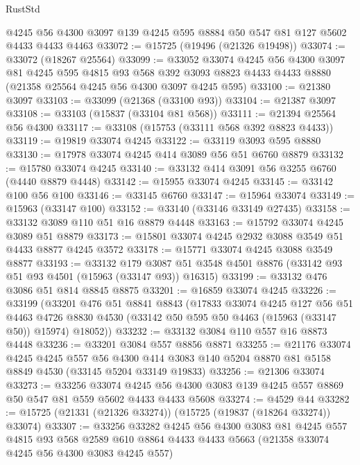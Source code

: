 \begin{lexlean}{RustStd}
\begin{coremodule}
    @4245
    @56
    @4300
    @3097
    @139
    @4245
    @595
    @8884
    @50
    @547
    @81
    @127
    @5602
    @4433
    @4433
    @4463
@33072 := @15725 (@19496 (@21326 @19498))
@33074 := @33072 (@18267 @25564)
@33099 := @33052
    @33074
    @4245
    @56
    @4300
    @3097
    @81
    @4245
    @595
    @4815
    @93
    @568
    @392
    @3093
    @8823
    @4433
    @4433
    @8880
    (@21358 @25564 @4245 @56 @4300 @3097 @4245 @595)
@33100 := @21380 @3097
@33103 := @33099 (@21368 (@33100 @93))
@33104 := @21387 @3097
@33108 := @33103 (@15837 (@33104 @81 @568))
@33111 := @21394 @25564 @56 @4300
@33117 := @33108 (@15753 (@33111 @568 @392 @8823 @4433))
@33119 := @19819 @33074 @4245
@33122 := @33119 @3093 @595 @8880
@33130 := @17978 @33074 @4245 @414 @3089 @56 @51 @6760 @8879
@33132 := @15780 @33074 @4245
@33140 := @33132 @414 @3091 @56 @3255 @6760 (@4440 @8879 @4448)
@33142 := @15955 @33074 @4245
@33145 := @33142 @100 @56 @100
@33146 := @33145 @6760
@33147 := @15964 @33074
@33149 := @15963 (@33147 @100)
@33152 := @33140 (@33146 @33149 @27435)
@33158 := @33132 @3089 @110 @51 @16 @8879 @4448
@33163 := @15792 @33074 @4245 @3089 @51 @8879
@33173 := @15801 @33074 @4245 @2932 @3088 @3549 @51 @4433 @8877 @4245 @3572
@33178 := @15771 @33074 @4245 @3088 @3549 @8877
@33193 := @33132
    @179
    @3087
    @51
    @3548
    @4501
    @8876
    (@33142 @93 @51 @93 @4501 (@15963 (@33147 @93)) @16315)
@33199 := @33132 @476 @3086 @51 @814 @8845 @8875
@33201 := @16859 @33074 @4245
@33226 := @33199
    (@33201
      @476
      @51
      @8841
      @8843
      (@17833
        @33074
        @4245
        @127
        @56
        @51
        @4463
        @4726
        @8830
        @4530
        (@33142 @50 @595 @50 @4463 (@15963 (@33147 @50)) @15974)
        @18052))
@33232 := @33132 @3084 @110 @557 @16 @8873 @4448
@33236 := @33201 @3084 @557 @8856 @8871
@33255 := @21176
    @33074
    @4245
    @4245
    @557
    @56
    @4300
    @414
    @3083
    @140
    @5204
    @8870
    @81
    @5158
    @8849
    @4530
    (@33145 @5204 @33149 @19833)
@33256 := @21306 @33074
@33273 := @33256
    @33074
    @4245
    @56
    @4300
    @3083
    @139
    @4245
    @557
    @8869
    @50
    @547
    @81
    @559
    @5602
    @4433
    @4433
    @5608
@33274 := @4529 @44
@33282 := @15725 (@21331 (@21326 @33274)) (@15725 (@19837 (@18264 @33274)) @33074)
@33307 := @33256
    @33282
    @4245
    @56
    @4300
    @3083
    @81
    @4245
    @557
    @4815
    @93
    @568
    @2589
    @610
    @8864
    @4433
    @4433
    @5663
    (@21358 @33074 @4245 @56 @4300 @3083 @4245 @557)

\end{coremodule}
\end{lexlean}

